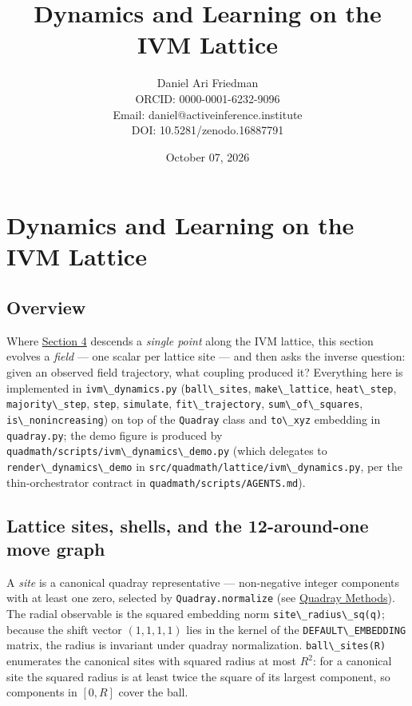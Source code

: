 \documentclass[
  10pt,
]{article}
\title{Dynamics and Learning on the IVM Lattice}
\author{Daniel Ari Friedman\\ ORCID: 0000-0001-6232-9096\\ Email: daniel@activeinference.institute\\ DOI: 10.5281/zenodo.16887791}
\date{October 07, 2026}
\newcommand{\passthrough}[1]{#1}
\begin{document}
\maketitle

{
\hypersetup{linkcolor=black}
\setcounter{tocdepth}{3}
\tableofcontents
}
\section{Dynamics and Learning on the IVM
Lattice}\label{dynamics-and-learning-on-the-ivm-lattice}

\subsection{Overview}\label{overview}

Where \href{04_optimization_in_4d.md}{Section 4} descends a \emph{single
point} along the IVM lattice, this section evolves a \emph{field} ---
one scalar per lattice site --- and then asks the inverse question:
given an observed field trajectory, what coupling produced it?
Everything here is implemented in
\passthrough{\lstinline!ivm\_dynamics.py!}
(\passthrough{\lstinline!ball\_sites!},
\passthrough{\lstinline!make\_lattice!},
\passthrough{\lstinline!heat\_step!},
\passthrough{\lstinline!majority\_step!},
\passthrough{\lstinline!step!}, \passthrough{\lstinline!simulate!},
\passthrough{\lstinline!fit\_trajectory!},
\passthrough{\lstinline!sum\_of\_squares!},
\passthrough{\lstinline!is\_nonincreasing!}) on top of the
\passthrough{\lstinline!Quadray!} class and
\passthrough{\lstinline!to\_xyz!} embedding in
\passthrough{\lstinline!quadray.py!}; the demo figure is produced by
\passthrough{\lstinline!quadmath/scripts/ivm\_dynamics\_demo.py!} (which
delegates to \passthrough{\lstinline!render\_dynamics\_demo!} in
\passthrough{\lstinline!src/quadmath/lattice/ivm\_dynamics.py!}, per the
thin-orchestrator contract in
\passthrough{\lstinline!quadmath/scripts/AGENTS.md!}).

\subsection{Lattice sites, shells, and the 12-around-one move
graph}\label{lattice-sites-shells-and-the-12-around-one-move-graph}

A \emph{site} is a canonical quadray representative --- non-negative
integer components with at least one zero, selected by
\passthrough{\lstinline!Quadray.normalize!} (see
\href{03_quadray_methods.md}{Quadray Methods}). The radial observable is
the squared embedding norm
\passthrough{\lstinline!site\_radius\_sq(q)!}; because the shift vector
\((1,1,1,1)\) lies in the kernel of the
\passthrough{\lstinline!DEFAULT\_EMBEDDING!} matrix, the radius is
invariant under quadray normalization.
\passthrough{\lstinline!ball\_sites(R)!} enumerates the canonical sites
with squared radius at most \(R^2\): for a canonical site the squared
radius is at least twice the square of its largest component, so
components in \([0, R]\) cover the ball.
\end{document}
